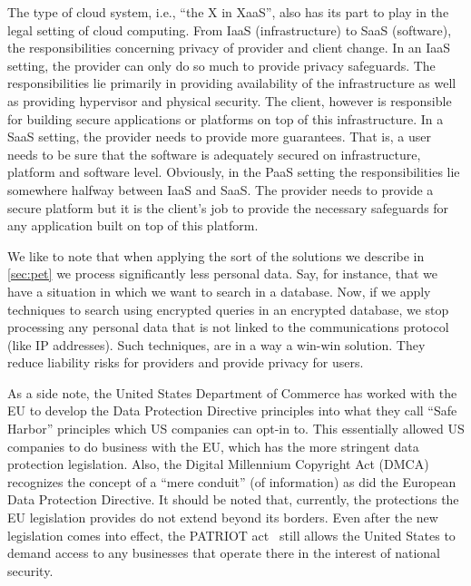 \documentclass[12pt]{article}
\begin{document}
The type of cloud system, i.e., ``the X in XaaS'', also has its part to play in the legal setting of cloud computing.
From IaaS (infrastructure) to SaaS (software), the responsibilities concerning privacy of provider and client change.
In an IaaS setting, the provider can only do so much to provide privacy safeguards.
The responsibilities lie primarily in providing availability of the infrastructure as well as providing hypervisor and physical security.
The client, however is responsible for building secure applications or platforms on top of this infrastructure.
In a SaaS setting, the provider needs to provide more guarantees.
That is, a user needs to be sure that the software is adequately secured on infrastructure, platform and software level.
Obviously, in the PaaS setting the responsibilities lie somewhere halfway between IaaS and SaaS. The provider needs to provide a secure platform but it is the client's job to provide the necessary safeguards for any application built on top of this platform.

We like to note that when applying the sort of the solutions we describe in \autoref{sec:pet} we process significantly less personal data. Say, for instance, that we have a situation in which we want to search in a database. Now, if we apply techniques to search using encrypted queries in an encrypted database, we stop processing any personal data that is not linked to the communications protocol (like IP addresses). Such techniques, are in a way a win-win solution. They reduce liability risks for providers and provide privacy for users.

As a side note, the United States Department of Commerce has worked with the EU to develop the Data Protection Directive principles into what they call ``Safe Harbor'' principles which US companies can opt-in to.
This essentially allowed US companies to do business with the EU, which has the more stringent data protection legislation.
Also, the Digital Millennium Copyright Act (DMCA) recognizes the concept of a ``mere conduit'' (of information) as did the European Data Protection Directive. \cite{congress1998digital}
It should be noted that, currently, the protections the EU legislation provides do not extend beyond its borders.
Even after the new legislation comes into effect, the PATRIOT act~\cite{mailman2002uniting} still allows the United States to demand access to any businesses that operate there in the interest of national security.

\end{document}

